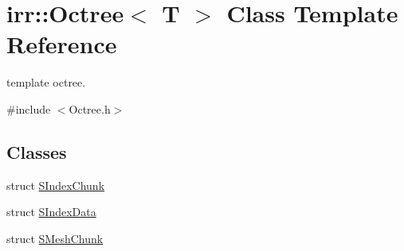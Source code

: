 \hypertarget{classirr_1_1_octree}{\section{irr\-:\-:Octree$<$ T $>$ Class Template Reference}
\label{classirr_1_1_octree}
}


template octree.  




{\ttfamily \#include $<$Octree.\-h$>$}

\subsection*{Classes}
\begin{DoxyCompactItemize}
\item 
struct \hyperlink{structirr_1_1_octree_1_1_s_index_chunk}{S\-Index\-Chunk}
\item 
struct \hyperlink{structirr_1_1_octree_1_1_s_index_data}{S\-Index\-Data}
\item 
struct \hyperlink{structirr_1_1_octree_1_1_s_mesh_chunk}{S\-Mesh\-Chunk}
\end{DoxyCompactItemize}
